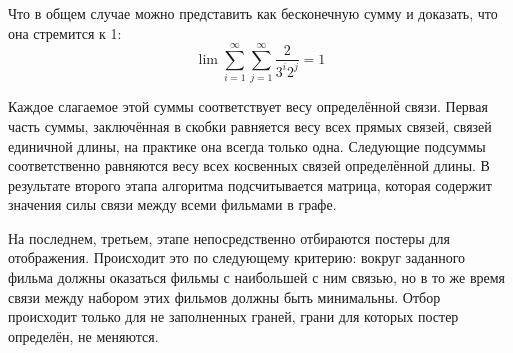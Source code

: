 \documentclass[oneside,final,14pt]{extreport}
\begin{document}
Что в общем случае можно представить как бесконечную сумму и доказать, что она стремится к 1:
\[ \lim \sum_{i=1}^{\infty} \sum_{j=1}^{\infty} \frac{2}{ 3^{i} 2^{j} } = 1 \]

Каждое слагаемое этой суммы соответствует весу определённой связи. Первая часть суммы, заключённая в скобки равняется весу всех прямых связей, связей единичной длины, на практике она всегда только одна. Следующие подсуммы соответственно равняются весу всех косвенных связей определённой длины. В результате второго этапа алгоритма подсчитывается матрица, которая содержит значения силы связи между всеми фильмами в графе.

На последнем, третьем, этапе непосредственно отбираются постеры для отображения. Происходит это по следующему критерию: вокруг заданного фильма должны оказаться фильмы с наибольшей с ним связью, но в то же время связи между набором этих фильмов должны быть минимальны. Отбор происходит только для не заполненных граней, грани для которых постер определён, не меняются.
\end{document}
